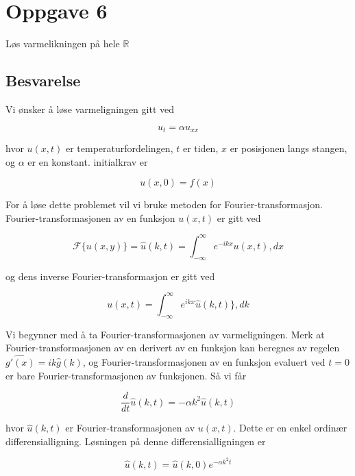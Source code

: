 \section{Oppgave 6}
Løs varmelikningen på hele $ \mathbb{R} $

\subsection*{Besvarelse}
Vi ønsker å løse varmeligningen gitt ved

\begin{equation*}
u_t = \alpha u_{xx}
\end{equation*}

hvor $u(x,t)$ er temperaturfordelingen, $t$ er tiden, $x$ er posisjonen langs stangen, og $\alpha$ er en konstant. initialkrav er

\begin{equation*}
u(x,0) = f(x)
\end{equation*}

For å løse dette problemet vil vi bruke metoden for Fourier-transformasjon. Fourier-transformasjonen av en funksjon $u(x,t)$ er gitt ved

\begin{equation*}
\mathscr{F}\{ u(x,y) \} =\hat{u}(k,t) = \int_{-\infty}^{\infty} e^{-ikx} u(x,t) , dx
\end{equation*}

og dens inverse Fourier-transformasjon er gitt ved

\begin{equation*}
u(x,t) =  \int_{-\infty}^{\infty} e^{ikx} \hat{u}(k,t) \} , dk
\end{equation*}

Vi begynner med å ta Fourier-transformasjonen av varmeligningen. Merk at Fourier-transformasjonen av en derivert av en funksjon kan beregnes av regelen $\widehat{g'(x)} = ik\hat{g}(k)$, og Fourier-transformasjonen av en funksjon evaluert ved $t=0$ er bare Fourier-transformasjonen av funksjonen. Så vi får

\begin{equation*}
\frac{d}{dt} \hat{u}(k,t) = -\alpha k^2 \hat{u}(k,t)
\end{equation*}

hvor $\hat{u}(k,t)$ er Fourier-transformasjonen av $u(x,t)$. Dette er en enkel ordinær differensialligning. Løsningen på denne differensialligningen er

\begin{equation*}
\hat{u}(k,t) = \hat{u}(k,0) e^{-\alpha k^2 t}
\end{equation*}


